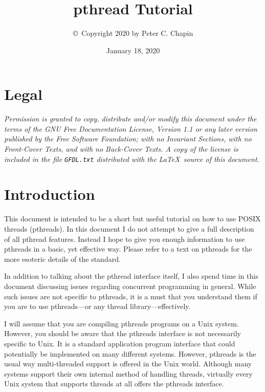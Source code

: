 \documentclass{article}
\begin{document}
\lstset{language=C,
        basicstyle=\small,
        stringstyle=\ttfamily,
        commentstyle=\ttfamily,
        xleftmargin=0.25in,
        showstringspaces=false}

\title{pthread Tutorial}
\author{\copyright\ Copyright 2020 by Peter C. Chapin}
\date{January 18, 2020}
\maketitle

\tableofcontents

\section*{Legal}
\label{sec:legal}

\textit{Permission is granted to copy, distribute and/or modify this document under the terms of
  the GNU Free Documentation License, Version 1.1 or any later version published by the Free
  Software Foundation; with no Invariant Sections, with no Front-Cover Texts, and with no
  Back-Cover Texts. A copy of the license is included in the file \texttt{GFDL.txt} distributed
  with the \LaTeX\ source of this document.}

\section{Introduction}
\label{sec:intro}

This document is intended to be a short but useful tutorial on how to use POSIX threads
(pthreads). In this document I do not attempt to give a full description of all pthread
features. Instead I hope to give you enough information to use pthreads in a basic, yet
effective way. Please refer to a text on pthreads for the more esoteric details of the standard.

In addition to talking about the pthread interface itself, I also spend time in this document
discussing issues regarding concurrent programming in general. While such issues are not
specific to pthreads, it is a must that you understand them if you are to use pthreads---or any
thread library---effectively.

I will assume that you are compiling pthreads programs on a Unix system. However, you should be
aware that the pthreads interface is not necessarily specific to Unix. It is a standard
application program interface that could potentially be implemented on many different systems.
However, pthreads is the usual way multi-threaded support is offered in the Unix world. Although
many systems support their own internal method of handling threads, virtually every Unix system
that supports threads at all offers the pthreads interface.
\end{document}
